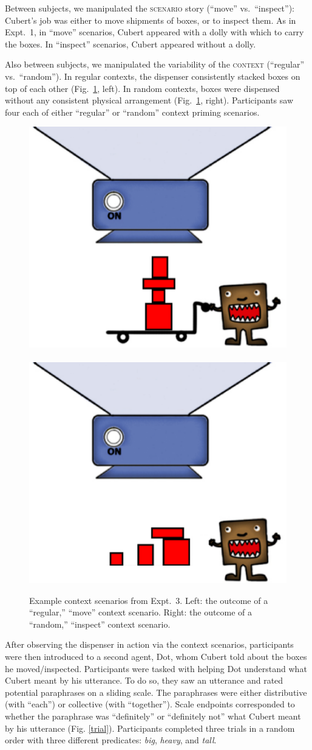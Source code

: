 \documentclass[linguex]{sp}
\begin{document}
Between subjects, we manipulated the \textsc{scenario} story (``move'' vs.~``inspect''): Cubert's job was either to move shipments of boxes, or to inspect them. As in Expt.~1, in ``move'' scenarios, Cubert appeared with a dolly with which to carry the boxes. In ``inspect'' scenarios, Cubert appeared without a dolly.

Also between subjects, we manipulated the variability of the \textsc{context} (``regular'' vs.~``random''). In regular contexts, the dispenser consistently stacked boxes on top of each other (Fig.~\ref{expt2context}, left). In random contexts, boxes were dispensed without any consistent physical arrangement (Fig.\ \ref{expt2context}, right). Participants saw four each of either ``regular'' or ``random'' context priming scenarios.

\begin{figure}[h]
\centering
\includegraphics[width=.45\textwidth]{images/context13reg.eps}
\ \ \ \ 
\includegraphics[width=.45\textwidth]{images/context13nodolly.eps}
\caption{Example context scenarios from Expt.~3. Left: the outcome of a ``regular,'' ``move'' context scenario. Right: the outcome of a ``random,'' ``inspect'' context scenario.\label{expt2context}}
\end{figure}


After observing the dispenser in action via the context  scenarios, participants were then introduced to a second agent, Dot, whom Cubert told about the boxes he moved/inspected. Participants were tasked with helping Dot understand what Cubert meant by his utterance. To do so, they saw an utterance and rated potential paraphrases on a sliding scale. The paraphrases were either distributive (with  ``each'') or collective (with ``together'').  Scale endpoints corresponded to whether the paraphrase was ``definitely'' or ``definitely not'' what Cubert meant by his utterance (Fig. \ref{trial}). Participants completed three trials in a random order with three different predicates: \emph{big}, \emph{heavy}, and \emph{tall}.
\end{document}
